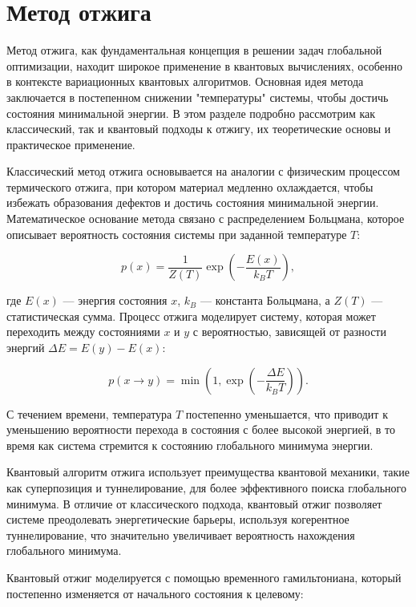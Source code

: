 \documentclass[a4paper]{report}
\begin{document}
\section{Метод отжига}

Метод отжига, как фундаментальная концепция в решении задач глобальной оптимизации, находит широкое применение в квантовых вычислениях, особенно в контексте вариационных квантовых алгоритмов. Основная идея метода заключается в постепенном снижении "температуры" системы, чтобы достичь состояния минимальной энергии. В этом разделе подробно рассмотрим как классический, так и квантовый подходы к отжигу, их теоретические основы и практическое применение.

Классический метод отжига основывается на аналогии с физическим процессом термического отжига, при котором материал медленно охлаждается, чтобы избежать образования дефектов и достичь состояния минимальной энергии. Математическое основание метода связано с распределением Больцмана, которое описывает вероятность состояния системы при заданной температуре $T$:

\begin{equation}
p(x) = \frac{1}{Z(T)} \exp\left(-\frac{E(x)}{k_B T}\right),
\end{equation}

где $E(x)$ — энергия состояния $x$, $k_B$ — константа Больцмана, а $Z(T)$ — статистическая сумма. Процесс отжига моделирует систему, которая может переходить между состояниями $x$ и $y$ с вероятностью, зависящей от разности энергий $\Delta E = E(y) - E(x)$:

\begin{equation}
p(x \rightarrow y) = \min\left(1, \exp\left(-\frac{\Delta E}{k_B T}\right)\right).
\end{equation}

С течением времени, температура $T$ постепенно уменьшается, что приводит к уменьшению вероятности перехода в состояния с более высокой энергией, в то время как система стремится к состоянию глобального минимума энергии.

Квантовый алгоритм отжига использует преимущества квантовой механики, такие как суперпозиция и туннелирование, для более эффективного поиска глобального минимума. В отличие от классического подхода, квантовый отжиг позволяет системе преодолевать энергетические барьеры, используя когерентное туннелирование, что значительно увеличивает вероятность нахождения глобального минимума.

Квантовый отжиг моделируется с помощью временного гамильтониана, который постепенно изменяется от начального состояния к целевому:
\end{document}
